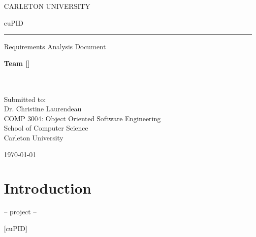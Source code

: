 \documentclass[12pt,letterpaper]{article}
\begin{document}
\thispagestyle{empty}

\begin{center}
	CARLETON UNIVERSITY
\end{center}

\vfill

\begin{center}
	{\fontsize{55pt}{55pt}\selectfont cuPID}
	\vspace{0.5em}\rule{\textwidth}{0.5pt}
	Requirements Analysis Document
\end{center}

\vspace{5em}

\begin{center}
	\textbf{Team [\teamname{}]}\\
	\personone{}\\
	\persontwo{}\\
	\personthree{}
\end{center}

\vfill

\begin{center}
	Submitted to:\\
	Dr. Christine Laurendeau\\
	COMP 3004: Object Oriented Software Engineering\\
	School of Computer Science\\
	Carleton University
\end{center}

\vspace{2em}

\begin{center}
	\today
\end{center}

\newpage{}

\tableofcontents{}

\renewcommand{\listfigurename}{Figures}
\listoffigures

\renewcommand{\listtablename}{Tables}
\listoftables

\newpage{}

\section{Introduction}

\begin{center}
    -- project --
\end{center}

\begin{center}
	\Huge [cuPID]
\end{center}
\end{document}
